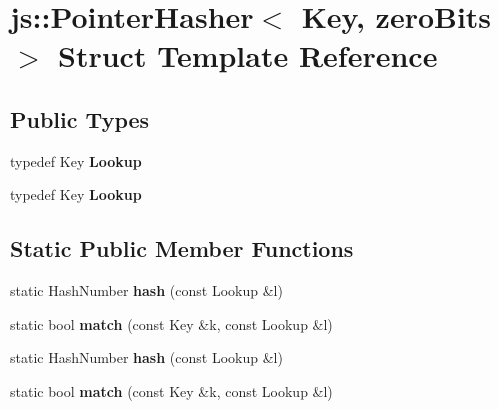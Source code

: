 \hypertarget{structjs_1_1_pointer_hasher}{\section{js\-:\-:Pointer\-Hasher$<$ Key, zero\-Bits $>$ Struct Template Reference}
\label{structjs_1_1_pointer_hasher}
}
\subsection*{Public Types}
\begin{DoxyCompactItemize}
\item 
\hypertarget{structjs_1_1_pointer_hasher_ada674eac9186e363f89b590d12d0de22}{typedef Key {\bfseries Lookup}}\label{structjs_1_1_pointer_hasher_ada674eac9186e363f89b590d12d0de22}

\item 
\hypertarget{structjs_1_1_pointer_hasher_ada674eac9186e363f89b590d12d0de22}{typedef Key {\bfseries Lookup}}\label{structjs_1_1_pointer_hasher_ada674eac9186e363f89b590d12d0de22}

\end{DoxyCompactItemize}
\subsection*{Static Public Member Functions}
\begin{DoxyCompactItemize}
\item 
\hypertarget{structjs_1_1_pointer_hasher_a42f482c29c919929a2b45f20befa7625}{static Hash\-Number {\bfseries hash} (const Lookup \&l)}\label{structjs_1_1_pointer_hasher_a42f482c29c919929a2b45f20befa7625}

\item 
\hypertarget{structjs_1_1_pointer_hasher_a85cb697e78dc59707d176d199e00ca6a}{static bool {\bfseries match} (const Key \&k, const Lookup \&l)}\label{structjs_1_1_pointer_hasher_a85cb697e78dc59707d176d199e00ca6a}

\item 
\hypertarget{structjs_1_1_pointer_hasher_a42f482c29c919929a2b45f20befa7625}{static Hash\-Number {\bfseries hash} (const Lookup \&l)}\label{structjs_1_1_pointer_hasher_a42f482c29c919929a2b45f20befa7625}

\item 
\hypertarget{structjs_1_1_pointer_hasher_a85cb697e78dc59707d176d199e00ca6a}{static bool {\bfseries match} (const Key \&k, const Lookup \&l)}\label{structjs_1_1_pointer_hasher_a85cb697e78dc59707d176d199e00ca6a}

\end{DoxyCompactItemize}
